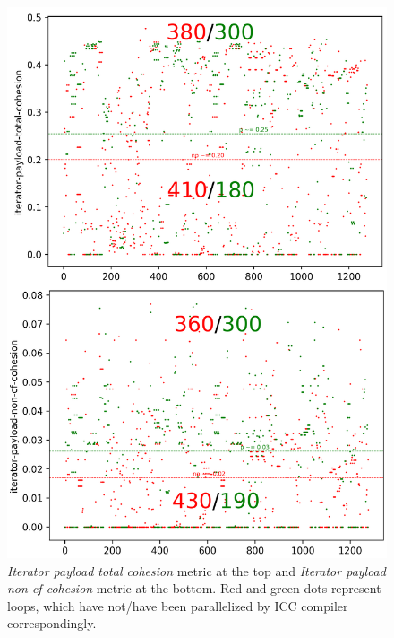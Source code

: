 \begin{figure}[H]
\centering
\includegraphics[width=\linewidth]{figs/loop-cohesion-1.png}
\caption{\textit{Iterator payload total cohesion} metric at the top and \textit{Iterator payload non-cf cohesion} metric at the bottom. Red and green dots represent loops, which have not/have been parallelized by ICC compiler correspondingly.}
\label{loop-cohesion-1}
\end{figure}
 
